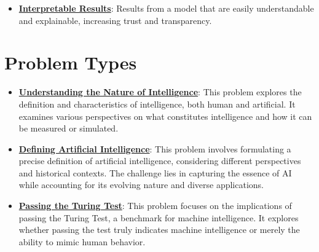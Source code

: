 \documentclass{article}%
\begin{document}
\begin{itemize}[leftmargin=*]
\item \href{https://purdue.brightspace.com/d2l/common/assets/pdfjs-d2l-dist/1.0.14-legacy/web/viewer.html?file=\%2Fcontent\%2Fenforced\%2F1095467-wl.202510.CS.24300.001\%2F16L2-ethics.pdf\%3Fou\%3D1095467\&lang=en-us\&container=d2l-fileviewer-rendered-pdf\&fullscreen=d2l-fileviewer-rendered-pdf-dialog\&height=667#page=28}{\textbf{Interpretable Results}}: Results from a model that are easily understandable and explainable, increasing trust and transparency.%
\end{itemize}

%
\section{Problem Types}%
\label{sec:ProblemTypes}%
\begin{itemize}[leftmargin=*]%
\item \href{https://purdue.brightspace.com/d2l/common/assets/pdfjs-d2l-dist/1.0.14-legacy/web/viewer.html?file=\%2Fcontent\%2Fenforced\%2F1095467-wl.202510.CS.24300.001\%2F02L2-Intro.pdf\%3Fou\%3D1095467\&lang=en-us\&container=d2l-fileviewer-rendered-pdf\&fullscreen=d2l-fileviewer-rendered-pdf-dialog\&height=667#page=5}{\textbf{Understanding the Nature of Intelligence}}: This problem explores the definition and characteristics of intelligence, both human and artificial. It examines various perspectives on what constitutes intelligence and how it can be measured or simulated.%
\item \href{https://purdue.brightspace.com/d2l/common/assets/pdfjs-d2l-dist/1.0.14-legacy/web/viewer.html?file=\%2Fcontent\%2Fenforced\%2F1095467-wl.202510.CS.24300.001\%2F02L2-Intro.pdf\%3Fou\%3D1095467\&lang=en-us\&container=d2l-fileviewer-rendered-pdf\&fullscreen=d2l-fileviewer-rendered-pdf-dialog\&height=667#page=5}{\textbf{Defining Artificial Intelligence}}: This problem involves formulating a precise definition of artificial intelligence, considering different perspectives and historical contexts. The challenge lies in capturing the essence of AI while accounting for its evolving nature and diverse applications.%
\item \href{https://purdue.brightspace.com/d2l/common/assets/pdfjs-d2l-dist/1.0.14-legacy/web/viewer.html?file=\%2Fcontent\%2Fenforced\%2F1095467-wl.202510.CS.24300.001\%2F02L2-Intro.pdf\%3Fou\%3D1095467\&lang=en-us\&container=d2l-fileviewer-rendered-pdf\&fullscreen=d2l-fileviewer-rendered-pdf-dialog\&height=667#page=6}{\textbf{Passing the Turing Test}}: This problem focuses on the implications of passing the Turing Test, a benchmark for machine intelligence. It explores whether passing the test truly indicates machine intelligence or merely the ability to mimic human behavior.%

\end{itemize}
\end{document}
